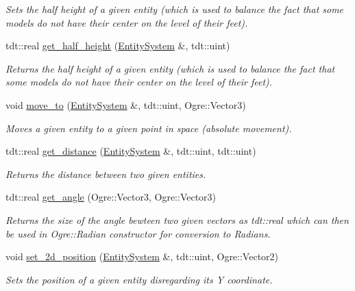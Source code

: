 \begin{DoxyCompactItemize}
\begin{DoxyCompactList}\small\item\em Sets the half height of a given entity (which is used to balance the fact that some models do not have their center on the level of their feet). \end{DoxyCompactList}\item 
tdt\+::real \hyperlink{namespace_physics_helper_a41efe27005d026afab0f3f2887a24960}{get\+\_\+half\+\_\+height} (\hyperlink{class_entity_system}{Entity\+System} \&, tdt\+::uint)
\begin{DoxyCompactList}\small\item\em Returns the half height of a given entity (which is used to balance the fact that some models do not have their center on the level of their feet). \end{DoxyCompactList}\item 
void \hyperlink{namespace_physics_helper_a1343e6dbfbbc58aa0d9f25463a65a00e}{move\+\_\+to} (\hyperlink{class_entity_system}{Entity\+System} \&, tdt\+::uint, Ogre\+::\+Vector3)
\begin{DoxyCompactList}\small\item\em Moves a given entity to a given point in space (absolute movement). \end{DoxyCompactList}\item 
tdt\+::real \hyperlink{namespace_physics_helper_a2924661b8158a64fb8ff63ad18ad9572}{get\+\_\+distance} (\hyperlink{class_entity_system}{Entity\+System} \&, tdt\+::uint, tdt\+::uint)
\begin{DoxyCompactList}\small\item\em Returns the distance between two given entities. \end{DoxyCompactList}\item 
tdt\+::real \hyperlink{namespace_physics_helper_ab4f7051401a2973dce3159f5df34ae02}{get\+\_\+angle} (Ogre\+::\+Vector3, Ogre\+::\+Vector3)
\begin{DoxyCompactList}\small\item\em Returns the size of the angle bewteen two given vectors as tdt\+::real which can then be used in Ogre\+::\+Radian constructor for conversion to Radians. \end{DoxyCompactList}\item 
void \hyperlink{namespace_physics_helper_ae2f1210782c892156de43d333891f154}{set\+\_\+2d\+\_\+position} (\hyperlink{class_entity_system}{Entity\+System} \&, tdt\+::uint, Ogre\+::\+Vector2)
\begin{DoxyCompactList}\small\item\em Sets the position of a given entity disregarding it\textquotesingle{}s Y coordinate. \end{DoxyCompactList}\item 

\end{DoxyCompactItemize}
